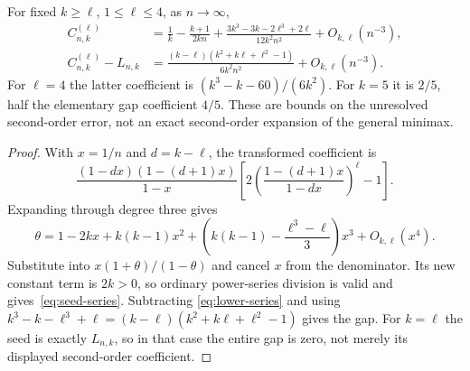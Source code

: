 \begin{proposition}\label{prop:seed-series}
For fixed $k\ge\ell$, $1\le\ell\le4$, as $n\to\infty$,
\begin{align}
 C^{(\ell)}_{n,k}
 &=\frac1k-\frac{k+1}{2kn}
 +\frac{3k^3-3k-2\ell^3+2\ell}{12k^2n^2}+O_{k,\ell}(n^{-3}),
 \label{eq:seed-series}\\
 C^{(\ell)}_{n,k}-L_{n,k}
 &=\frac{(k-\ell)(k^2+k\ell+\ell^2-1)}{6k^2n^2}
       +O_{k,\ell}(n^{-3}).\label{eq:seed-gap}
\end{align}
For $\ell=4$ the latter coefficient is $(k^3-k-60)/(6k^2)$.
For $k=5$ it is $2/5$, half the elementary gap coefficient $4/5$.
These are bounds on the unresolved second-order error, not an exact
second-order expansion of the general minimax.
\end{proposition}
\begin{proof}
With $x=1/n$ and $d=k-\ell$, the transformed coefficient is
\[
 \frac{(1-dx)(1-(d+1)x)}{1-x}
 \left[2\left(\frac{1-(d+1)x}{1-dx}\right)^\ell-1\right].
\]
Expanding through degree three gives
\[
 \theta=1-2kx+k(k-1)x^2+
 \left(k(k-1)-\frac{\ell^3-\ell}{3}\right)x^3+O_{k,\ell}(x^4).
\]
Substitute into $x(1+\theta)/(1-\theta)$ and cancel $x$ from the
denominator. Its new constant term is $2k>0$, so ordinary power-series
division is valid and gives~\eqref{eq:seed-series}. Subtracting
\eqref{eq:lower-series} and using
$k^3-k-\ell^3+\ell=(k-\ell)(k^2+k\ell+\ell^2-1)$ gives the gap.
For $k=\ell$ the seed is exactly $L_{n,k}$, so in that case the entire
gap is zero, not merely its displayed second-order coefficient.
\end{proof}
